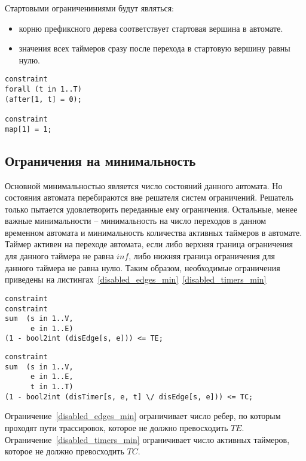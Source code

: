 \documentclass[times,specification,annotation]{itmo-student-thesis}
\begin{document}
Стартовыми ограничениниями будут являться:

\begin{itemize}
  \item корню префиксного дерева соответствует стартовая вершина в автомате. 
  \item значения всех таймеров сразу после перехода в стартовую вершину равны нулю.
\end{itemize}

\begin{lstlisting}[float=!h,language=Mzn,caption={Стартовые ограничения},label={start_constraint}]
constraint
forall (t in 1..T)
(after[1, t] = 0);

constraint
map[1] = 1;
\end{lstlisting}

\subsection{Ограничения на минимальность}

Основной минимальностью является число состояний данного автомата. Но состояния автомата перебираются вне решателя систем ограничений. Решатель только пытается удовлетворить
переданные ему ограничения. Остальные, менее важные минимальности -- минимальность на число переходов в данном временном автомата и минимальность количества
активных таймеров в автомате. Таймер активен на переходе автомата, если либо верхняя граница ограничения для данного таймера не равна $inf$, либо нижняя граница ограничения
для данного таймера не равна нулю. Таким образом, необходимые ограничения приведены на листингах~\ref{disabled_edges_min}~\ref{disabled_timers_min}

\begin{lstlisting}[float=!h,language=Mzn,caption={Стартовые ограничения-1},label={disabled_edges_min}]
constraint
constraint
sum  (s in 1..V,
      e in 1..E)
(1 - bool2int (disEdge[s, e])) <= TE;
\end{lstlisting}

\begin{lstlisting}[float=!h,language=Mzn,caption={Стартовые ограничения-2},label={disabled_timers_min}]
constraint
sum  (s in 1..V,
      e in 1..E,
      t in 1..T)
(1 - bool2int (disTimer[s, e, t] \/ disEdge[s, e])) <= TC;
\end{lstlisting}

Ограничение~\ref{disabled_edges_min} ограничивает число ребер, по которым проходят пути трассировок, которое не должно превосходить $TE$.
Ограничение~\ref{disabled_timers_min} ограничивает число активных таймеров, которое не должно превосходить $TC$.
\end{document}
